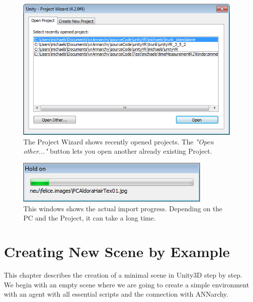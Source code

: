\documentclass[10pt,final]{scrreprt}
\begin{document}
\begin{figure}[h]
\begin{center}
\includegraphics{images/projectwizard.png}
\end{center}
\caption{The Project Wizard shows recently opened projects. The \emph{"Open other..."} button lets you open another already existing Project.}
\label{imgprojectwizard}
\end{figure}


\begin{figure}[h]
\begin{center}
\includegraphics{images/importprogress.png}
\end{center}
\caption{This windows shows the actual import progress. Depending on the PC and the Project, it can take a long time.}
\label{imgimportprogress}
\end{figure}

\newpage


\chapter{Creating New Scene by Example}

This chapter describes the creation of a minimal scene in Unity3D step by step. We begin with an empty scene where we are going to create a simple environment with an agent with all essential scripts and the connection with ANNarchy.

\end{document}
